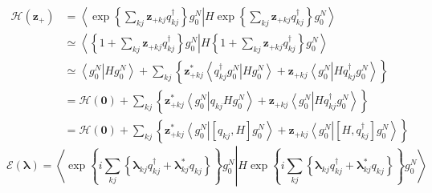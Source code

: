 \documentclass[aps,preprint]{revtex4}%
\begin{document}
\begin{align}
\mathcal{H}\left(  \mathbf{z}_{+}\right)   &  =\left\langle \exp\left\{
\sum_{kj}\mathbf{z}_{+kj}q_{kj}^{\dagger}\right\}  g_{0}^{N}\right.
\left\vert H\exp\left\{  \sum_{kj}\mathbf{z}_{+kj}q_{kj}^{\dagger}\right\}
g_{0}^{N}\right\rangle \\
&  \simeq\left\langle \left\{  1+\sum_{kj}\mathbf{z}_{+kj}q_{kj}^{\dagger
}\right\}  g_{0}^{N}\right.  \left\vert H\left\{  1+\sum_{kj}\mathbf{z}%
_{+kj}q_{kj}^{\dagger}\right\}  g_{0}^{N}\right\rangle \\
&  \simeq\left\langle g_{0}^{N}\right.  \left\vert Hg_{0}^{N}\right\rangle
+\sum_{kj}\left\{  \mathbf{z}_{+kj}^{\ast}\left\langle q_{kj}^{\dagger}%
g_{0}^{N}\right.  \left\vert Hg_{0}^{N}\right\rangle +\mathbf{z}%
_{+kj}\left\langle g_{0}^{N}\right.  \left\vert Hq_{kj}^{\dagger}g_{0}%
^{N}\right\rangle \right\} \\
&  =\mathcal{H}\left(  \mathbf{0}\right)  +\sum_{kj}\left\{  \mathbf{z}%
_{+kj}^{\ast}\left\langle g_{0}^{N}\right.  \left\vert q_{kj}Hg_{0}%
^{N}\right\rangle +\mathbf{z}_{+kj}\left\langle g_{0}^{N}\right.  \left\vert
Hq_{kj}^{\dagger}g_{0}^{N}\right\rangle \right\} \\
&  =\mathcal{H}\left(  \mathbf{0}\right)  +\sum_{kj}\left\{  \mathbf{z}%
_{+kj}^{\ast}\left\langle g_{0}^{N}\right.  \left\vert \left[  q_{kj}%
,H\right]  g_{0}^{N}\right\rangle +\mathbf{z}_{+kj}\left\langle g_{0}%
^{N}\right.  \left\vert \left[  H,q_{kj}^{\dagger}\right]  g_{0}%
^{N}\right\rangle \right\}
\end{align}%
\begin{equation}
\mathcal{E}\left(  \mathbf{\lambda}\right)  =\left\langle \exp\left\{
i\sum_{kj}\left\{  \mathbf{\lambda}_{kj}q_{kj}^{\dagger}+\mathbf{\lambda}%
_{kj}^{\ast}q_{kj}\right\}  \right\}  g_{0}^{N}\right.  \left\vert
H\exp\left\{  i\sum_{kj}\left\{  \mathbf{\lambda}_{kj}q_{kj}^{\dagger
}+\mathbf{\lambda}_{kj}^{\ast}q_{kj}\right\}  \right\}  g_{0}^{N}%
\right\rangle
\end{equation}%
\end{document}
